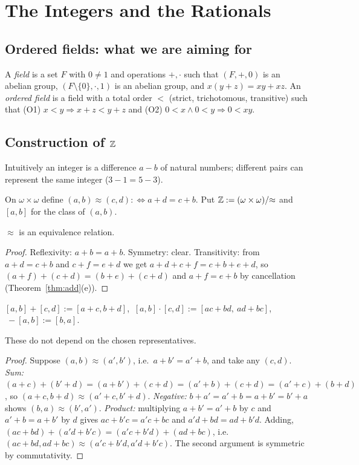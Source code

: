 \chapter{The Integers and the Rationals}\label{ch:zq}

\section{Ordered fields: what we are aiming for}

\begin{definition}\label{def:orderedfield}
	A \emph{field} is a set $F$ with $0\neq1$ and operations $+,\cdot$ such that $(F,+,0)$ is an abelian group, $(F\setminus\{0\},\cdot,1)$ is an abelian group, and $x(y+z)=xy+xz$. An \emph{ordered field} is a field with a total order $<$ (strict, trichotomous, transitive) such that (O1) $x<y\Rightarrow x+z<y+z$ and (O2) $0<x\wedge0<y\Rightarrow0<xy$.
\end{definition}

\section{Construction of $\mathbb{Z}$}

Intuitively an integer is a difference $a-b$ of natural numbers; different pairs can represent the same integer ($3-1=5-3$).

\begin{definition}[Integers]
	On $\omega\times\omega$ define $(a,b)\approx(c,d):\iff a+d=c+b$. Put $\mathbb{Z}:=(\omega\times\omega)/{\approx}$ and $[a,b]$ for the class of $(a,b)$.
\end{definition}

\begin{proposition}\label{prop:Zequiv}
	$\approx$ is an equivalence relation.
\end{proposition}
\begin{proof}
	Reflexivity: $a+b=a+b$. Symmetry: clear. Transitivity: from $a+d=c+b$ and $c+f=e+d$ we get $a+d+c+f=c+b+e+d$, so $(a+f)+(c+d)=(b+e)+(c+d)$ and $a+f=e+b$ by cancellation (Theorem~\ref{thm:add}(e)).
\end{proof}

\begin{definition}[Operations]
	$[a,b]+[c,d]:=[a+c,b+d]$, $\ [a,b]\cdot[c,d]:=[ac+bd,\ ad+bc]$, $\ -[a,b]:=[b,a]$.
\end{definition}

\begin{proposition}\label{prop:Zwd}
	These do not depend on the chosen representatives.
\end{proposition}
\begin{proof}
	Suppose $(a,b)\approx(a',b')$, i.e.\ $a+b'=a'+b$, and take any $(c,d)$. \emph{Sum:} $(a+c)+(b'+d)=(a+b')+(c+d)=(a'+b)+(c+d)=(a'+c)+(b+d)$, so $(a+c,b+d)\approx(a'+c,b'+d)$. \emph{Negative:} $b+a'=a'+b=a+b'=b'+a$ shows $(b,a)\approx(b',a')$. \emph{Product:} multiplying $a+b'=a'+b$ by $c$ and $a'+b=a+b'$ by $d$ gives $ac+b'c=a'c+bc$ and $a'd+bd=ad+b'd$. Adding, $(ac+bd)+(a'd+b'c)=(a'c+b'd)+(ad+bc)$, i.e.\ $(ac+bd,ad+bc)\approx(a'c+b'd,a'd+b'c)$. The second argument is symmetric by commutativity.
\end{proof}

